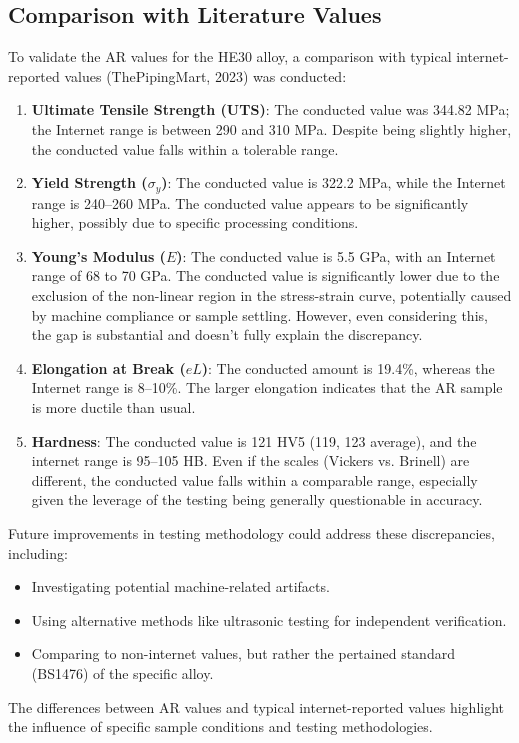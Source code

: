 \documentclass{article}
\begin{document}
{\subsection{Comparison with Literature Values}
To validate the AR values for the HE30 alloy, a comparison with typical internet-reported values (ThePipingMart, 2023) was conducted:
\begin{enumerate}
    \item \textbf{Ultimate Tensile Strength (UTS)}: The conducted value was 344.82 MPa; the Internet range is between 290 and 310 MPa. Despite being slightly higher, the conducted value falls within a tolerable range.
    \item \textbf{Yield Strength (\( \sigma_y \))}: The conducted value is 322.2 MPa, while the Internet range is 240–260 MPa. The conducted value appears to be significantly higher, possibly due to specific processing conditions.
    \item \textbf{Young’s Modulus (\( E \))}: The conducted value is 5.5 GPa, with an Internet range of 68 to 70 GPa. The conducted value is significantly lower due to the exclusion of the non-linear region in the stress-strain curve, potentially caused by machine compliance or sample settling. However, even considering this, the gap is substantial and doesn't fully explain the discrepancy. 
    \item \textbf{Elongation at Break (\( eL \))}: The conducted amount is 19.4\%, whereas the Internet range is 8–10\%. The larger elongation indicates that the AR sample is more ductile than usual.
    \item \textbf{Hardness}: The conducted value is 121 HV5 (119, 123 average), and the internet range is 95–105 HB. Even if the scales (Vickers vs. Brinell) are different, the conducted value falls within a comparable range, especially given the leverage of the testing being generally questionable in accuracy.
\end{enumerate}
Future improvements in testing methodology could address these discrepancies, including:
\begin{itemize}
    \item Investigating potential machine-related artifacts.
    \item Using alternative methods like ultrasonic testing for independent verification.
    \item Comparing to non-internet values, but rather the pertained standard (BS1476) of the specific alloy.
\end{itemize}
The differences between AR values and typical internet-reported values highlight the influence of specific sample conditions and testing methodologies.

}
\end{document}
